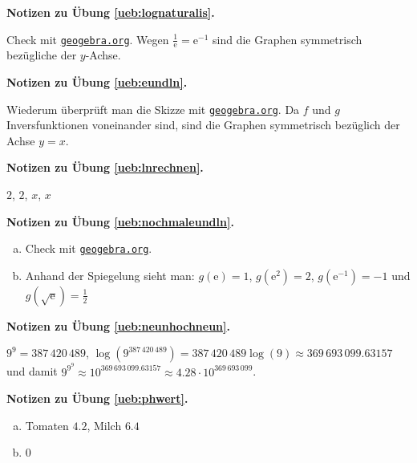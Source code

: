 \documentclass[%
11pt,%
twoside,%
titlepage,%
swissgerman,%
headsepline%
]{scrartcl}
\newcommand{\faReturnGray}{\textcolor{gray}{\faMailReply}} %
\newcommand{\geogebralink}{\href{https://www.geogebra.org/calculator}{\texttt{geogebra.org}}}
\theoremstyle{definition}
\theoremstyle{plain}
\newcommand{\concatueb}[1]{ueb:#1}%
\newcommand{\concatlsg}[1]{lsg:#1}%
\newenvironment{lsg}[1]{%
    \par\noindent\textbf{Notizen zu Übung \ref{\concatueb{#1}}.}%
    \label{\concatlsg{#1}} %
    \hfill\hyperref[\concatueb{#1}]{\faReturnGray}\par %
}{%
    \par%
}
\begin{document}
\begin{lsg}{lognaturalis}
    Check mit \geogebralink. Wegen $\frac{1}{\mathrm{e}}=\mathrm{e}^{-1}$ sind die Graphen symmetrisch bezügliche der $y$-Achse.
\end{lsg}
\begin{lsg}{eundln}
    Wiederum überprüft man die Skizze mit \geogebralink. Da $f$ und $g$ Inversfunktionen voneinander sind, sind die Graphen symmetrisch bezüglich der Achse $y=x$.
\end{lsg}
\begin{lsg}{lnrechnen}
    $2$, $2$, $x$, $x$
\end{lsg}
\begin{lsg}{nochmaleundln}
    \begin{enumerate}[a)]
        \item Check mit \geogebralink.
        \item Anhand der Spiegelung sieht man: $g(\mathrm{e})=1$, $g(\mathrm{e}^2)=2$, $g(\mathrm{e}^{-1})=-1$ und $g(\sqrt{\mathrm{e}})=\frac{1}{2}$
    \end{enumerate}
\end{lsg}
\begin{lsg}{neunhochneun}
    $9^9=387\,420\,489$, $\log(9^{387\,420\,489})=387\,420\,489\log(9)\approx369\,693\,099.63157$ und damit $9^{9^9}\approx10^{369\,693\,099.63157}\approx4.28\cdot10^{369\,693\,099}$.
\end{lsg}

\begin{lsg}{phwert}
    \begin{enumerate}[a)]
        \item Tomaten $4.2$, Milch $6.4$
        \item $0$
    \end{enumerate}
\end{lsg}
\end{document}
